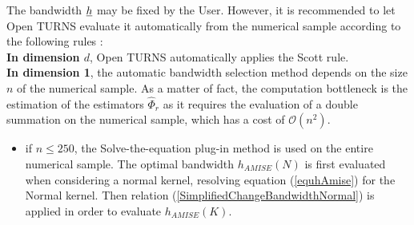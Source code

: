 {  The bandwidth ${\underline{h}}$ may be fixed by the User. However, it is recommended to let Open TURNS evaluate it automatically from the numerical sample according to the following rules :\\

  {\bf In dimension $d$}, Open TURNS automatically applies the Scott rule.\\




  {\bf In dimension 1}, the automatic bandwidth selection method depends  on the size $n$ of the numerical sample. As a matter of fact, the computation bottleneck is the estimation of the estimators $\hat{\Phi}_r$ as it requires the evaluation of a double summation on the numerical sample, which has a cost of $\mathcal{O}(n^2)$.
  \begin{itemize}
  \item if $n \leq 250$, the Solve-the-equation  plug-in method is used on the entire numerical sample. The optimal bandwidth $h_{AMISE}(N)$  is first evaluated when considering a normal kernel, resolving equation (\ref{equhAmise}) for the Normal kernel. Then relation (\ref{SimplifiedChangeBandwidthNormal}) is applied in order to evaluate $h_{AMISE}(K)$.


\end{itemize}}
